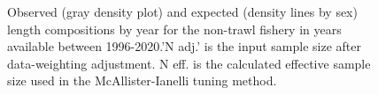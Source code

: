 \documentclass[
]{scrartcl}
\begin{document}
\begin{figure}[H]


\caption{\label{fig-len-fit-nt-1}Observed (gray density plot) and
expected (density lines by sex) length compositions by year for the
non-trawl fishery in years available between 1996-2020.'N adj.' is the
input sample size after data-weighting adjustment. N eff. is the
calculated effective sample size used in the McAllister-Ianelli tuning
method.}

\end{figure}%
\end{document}
